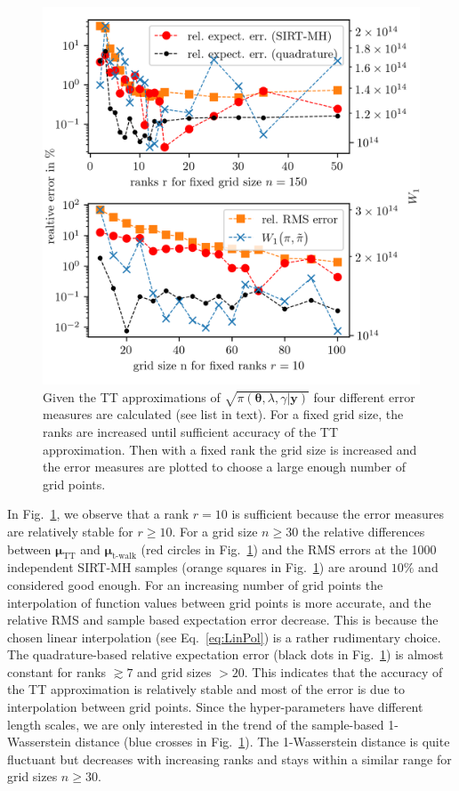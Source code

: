 \begin{figure}[ht!]
	\centering
	\includegraphics[]{findGridRank.png}
	\caption[Optimal rank and number of grid points for TT approximation.]{Given the TT approximations of $\sqrt{\pi( \bm{\theta},\lambda,\gamma  | \bm{y}) }$ four different error measures are calculated (see list in text).
		For a fixed grid size, the ranks are increased until sufficient accuracy of the TT approximation.
		Then with a fixed rank the grid size is increased and the error measures are plotted to choose a large enough number of grid points.}
	\label{fig:FindRankGrid}
\end{figure}
 
In Fig.~\ref{fig:FindRankGrid}, we observe that a rank $r = 10$ is sufficient because the error measures are relatively stable for $r\geq10$.
For a grid size $n \geq 30$ the relative differences between $\bm{\mu}_{\text{TT}}$ and $\bm{\mu}_{\text{t-walk}}$ (red circles in Fig.~\ref{fig:FindRankGrid}) and the RMS errors at the 1000 independent SIRT-MH samples (orange squares in Fig.~\ref{fig:FindRankGrid}) are around $ 10\%$ and considered good enough.
For an increasing number of grid points the interpolation of function values between grid points is more accurate, and the relative RMS and sample based expectation error decrease.
This is because the chosen linear interpolation (see Eq.~\ref{eq:LinPol}) is a rather rudimentary choice.
The quadrature-based relative expectation error (black dots in Fig.~\ref{fig:FindRankGrid}) is almost constant for ranks $ \gtrsim 7$ and grid sizes $ > 20$.
This indicates that the accuracy of the TT approximation is relatively stable and most of the error is due to interpolation between grid points.
Since the hyper-parameters have different length scales, we are only interested in the trend of the sample-based 1-Wasserstein distance (blue crosses in Fig.~\ref{fig:FindRankGrid}).
The 1-Wasserstein distance is quite fluctuant but decreases with increasing ranks and stays within a similar range for grid sizes $n \geq 30$.


